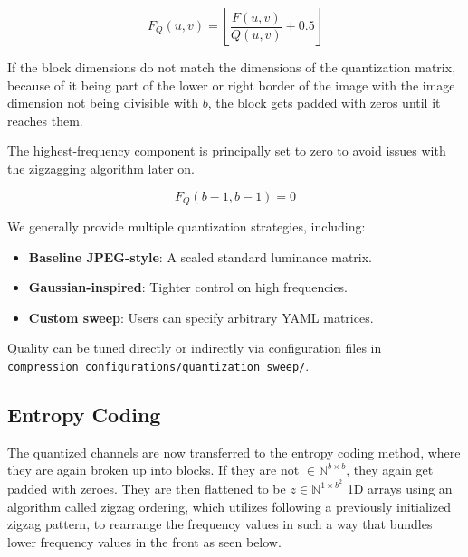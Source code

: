 
\begin{equation}
F_Q(u,v) = \left\lfloor \frac{F(u,v)}{Q(u,v)} + 0.5 \right\rfloor
\end{equation}

If the block dimensions do not match the dimensions of the quantization matrix, because of it being part of the lower or right border of the image with the image dimension not being divisible with \(b\), the block gets padded with zeros until it reaches them.

The highest-frequency component is principally set to zero to avoid issues with the zigzagging algorithm later on.

\begin{equation}
	F_Q(b-1,b-1) = 0
\end{equation}

We generally provide multiple quantization strategies, including:
\begin{itemize}
    \item \textbf{Baseline JPEG-style}: A scaled standard luminance matrix.
    \item \textbf{Gaussian-inspired}: Tighter control on high frequencies.
    \item \textbf{Custom sweep}: Users can specify arbitrary YAML matrices.
\end{itemize}

Quality can be tuned directly or indirectly via configuration files in \texttt{compression\_configurations/\allowbreak quantization\_sweep/}.

\subsection{Entropy Coding}
The quantized channels are now transferred to the entropy coding method, where they are again broken up into blocks. If they are not \(\in \mathbb{N}^{b\times b}\), they again get padded with zeroes. They are then flattened to be \(z \in \mathbb{N}^{1\times b^2}\) 1D arrays using an algorithm called zigzag ordering, which utilizes following a previously initialized zigzag pattern, to rearrange the frequency values in such a way that bundles lower frequency values in the front as seen below.

